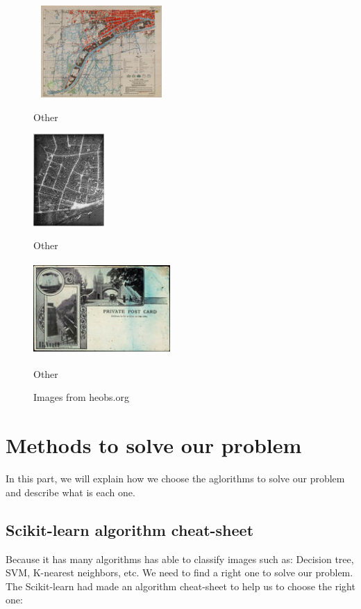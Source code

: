 \documentclass[hidelinks,12pt,a4paper]{report}
\begin{document}
\begin{figure}[!htb]
  \includegraphics[width=5.2cm, height=3.5cm, left]{images/sample/other_129}
  \captionsetup{labelformat=empty}
  \caption{Other}
\endminipage\hfill
{}
  \includegraphics[height=3.5cm, center]{images/sample/other_190}
  \captionsetup{labelformat=empty}
  \caption{Other}
\endminipage\hfill
{}%
  \includegraphics[width=5.2cm, height=3.5cm, right]{images/sample/other_202}
  \captionsetup{labelformat=empty}
  \caption{Other}
\endminipage
  \caption{Images from heobs.org}
\end{figure}

\chapter{Methods to solve our problem}
In this part, we will explain how we choose the aglorithms to solve our problem and describe what is each one.
\section{Scikit-learn algorithm cheat-sheet\cite{scikitlearn.org}}
Because it has many algorithms has able to classify images such as: Decision tree\cite{j.r.quinlan1985}, SVM\cite{stever.gunn1998}, K-nearest neighbors\cite{orenanavakfiry.levy2017}, etc. We need to find a right one to solve our problem. The Scikit-learn had made an algorithm cheat-sheet to help us to choose the right one:
\end{document}
